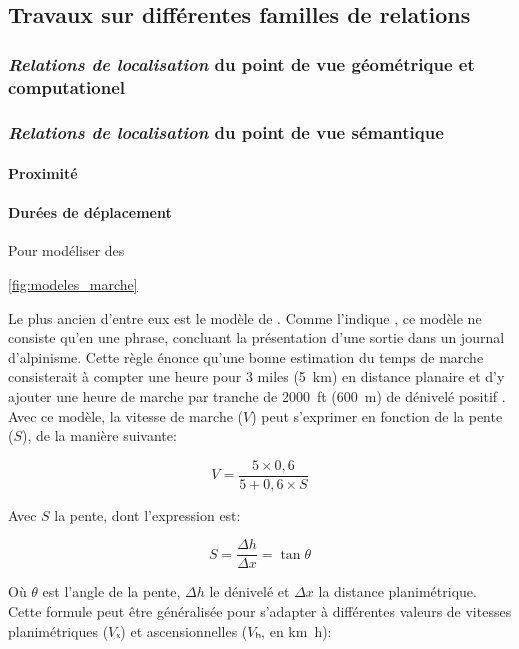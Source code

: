 \subsection{Travaux sur différentes familles de relations}

\subsubsection{\emph{Relations de localisation} du point de vue géométrique et
  computationel}

\subsubsection{\emph{Relations de localisation} du point de vue sémantique}

\paragraph{Proximité}

\paragraph{Durées de déplacement}

Pour modéliser des

\autoref{fig:modeles_marche}

Le plus ancien d'entre eux est le modèle de
\textcite{Naismith1892}. Comme l'indique \textcite{Duchene2019}, ce
modèle ne consiste qu'en une phrase, concluant la présentation d'une
sortie dans un journal d'alpinisme. Cette règle énonce qu'une bonne
estimation du temps de marche consisterait à compter une heure pour 3
miles (\SI{5}{\kilo\meter}) en distance planaire et d'y ajouter une
heure de marche par tranche de \SI{2000}{ft} (\SI{600}{\meter}) de
dénivelé positif \autocite{Naismith1892}. Avec ce modèle, la vitesse
de marche (\(V\)) peut s'exprimer en fonction de la pente (\(S\)), de
la manière suivante:

\begin{equation}
  \label{eq:marche_naismith}
  V = \dfrac{5 × 0,6}{5 + 0,6 × S}
\end{equation}

Avec \(S\) la pente, dont l'expression est:

\begin{equation}
 S = \dfrac{Δh}{Δx} = \tan θ
\end{equation}

Où \(θ\) est l'angle de la pente, \(Δh\) le dénivelé et \(Δx\) la
distance planimétrique. Cette formule peut être généralisée pour
s'adapter à différentes valeurs de vitesses planimétriques (\(Vₓ\)) et
ascensionnelles (\(Vₕ\), en \si{\kilo\meter\hour}):

